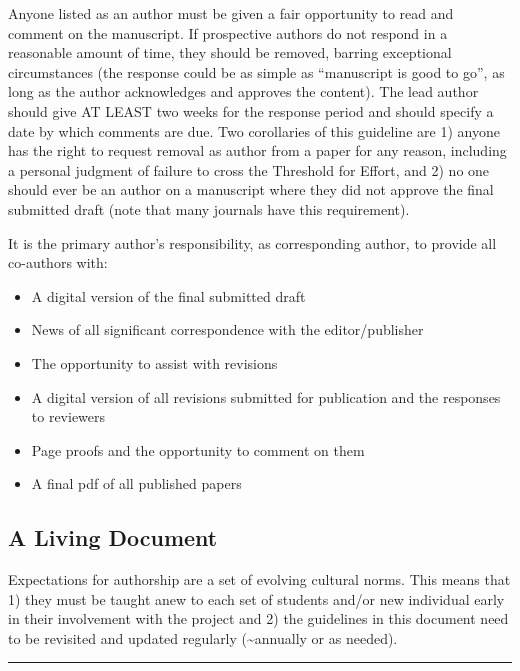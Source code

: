 \documentclass[]{article}
\begin{document}
Anyone listed as an author must be given a fair opportunity to read and
comment on the manuscript. If prospective authors do not respond in a
reasonable amount of time, they should be removed, barring exceptional
circumstances (the response could be as simple as ``manuscript is good
to go'', as long as the author acknowledges and approves the content).
The lead author should give AT LEAST two weeks for the response period
and should specify a date by which comments are due. Two corollaries of
this guideline are 1) anyone has the right to request removal as author
from a paper for any reason, including a personal judgment of failure to
cross the Threshold for Effort, and 2) no one should ever be an author
on a manuscript where they did not approve the final submitted draft
(note that many journals have this requirement).

It is the primary author's responsibility, as corresponding author, to
provide all co-authors with:

\begin{itemize}
\item
  A digital version of the final submitted draft
\item
  News of all significant correspondence with the editor/publisher
\item
  The opportunity to assist with revisions
\item
  A digital version of all revisions submitted for publication and the
  responses to reviewers
\item
  Page proofs and the opportunity to comment on them
\item
  A final pdf of all published papers
\end{itemize}

\hypertarget{a-living-document}{%
\subsection{\texorpdfstring{\textbf{A Living
Document}}{A Living Document}}\label{a-living-document}}

Expectations for authorship are a set of evolving cultural norms. This
means that 1) they must be taught anew to each set of students and/or
new individual early in their involvement with the project and 2) the
guidelines in this document need to be revisited and updated regularly
(\textasciitilde{}annually or as needed).

\begin{center}\rule{0.5\linewidth}{\linethickness}\end{center}
\end{document}
